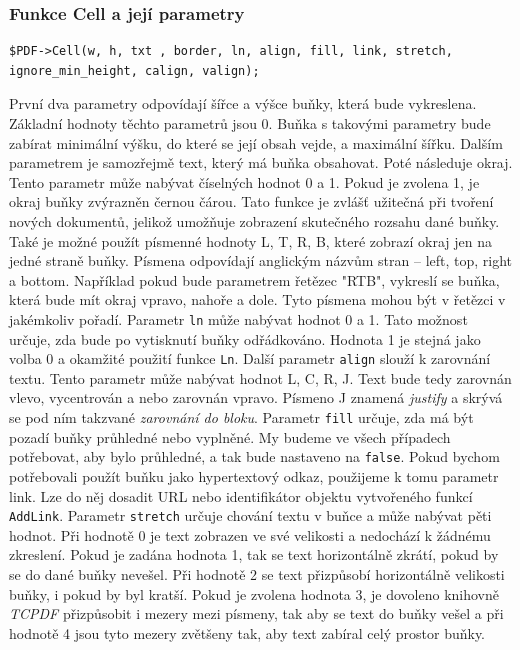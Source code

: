 \documentclass[czech,BP]{thesiskiv}
\begin{document}
\subsubsection{Funkce Cell a její parametry}
\begin{lstlisting}
$PDF->Cell(w, h, txt , border, ln, align, fill, link, stretch, ignore_min_height, calign, valign);
\end{lstlisting}
První dva parametry odpovídají šířce a výšce buňky, která bude vykreslena. Základní hodnoty těchto parametrů jsou 0. Buňka s takovými parametry bude zabírat minimální výšku, do které se její obsah vejde, a maximální šířku. 
Dalším parametrem je samozřejmě text, který má buňka obsahovat. 
Poté následuje okraj. Tento parametr může nabývat číselných hodnot 0 a 1. Pokud je zvolena 1, je okraj buňky zvýrazněn černou čárou. Tato funkce je zvlášť užitečná při tvoření nových dokumentů, jelikož umožňuje zobrazení skutečného rozsahu dané buňky. Také je možné použít písmenné hodnoty L, T, R, B, které zobrazí okraj jen na jedné straně buňky. Písmena odpovídají anglickým názvům stran -- left, top, right a bottom. Například pokud bude parametrem řetězec "RTB", vykreslí se buňka, která bude mít okraj vpravo, nahoře a dole. Tyto písmena mohou být v řetězci v jakémkoliv pořadí.
Parametr \texttt{ln} může nabývat hodnot 0 a 1. Tato možnost určuje, zda bude po vytisknutí buňky odřádkováno. Hodnota 1 je stejná jako volba 0 a okamžité použití funkce \texttt{Ln}. 
Další parametr \texttt{align} slouží k zarovnání textu. Tento parametr může nabývat hodnot L, C, R, J. Text bude tedy zarovnán vlevo, vycentrován a nebo zarovnán vpravo. Písmeno J znamená \emph{justify} a skrývá se pod ním takzvané \emph{zarovnání do bloku}. 
Parametr \texttt{fill} určuje, zda má být pozadí buňky průhledné nebo vyplněné. My budeme ve všech případech potřebovat, aby bylo průhledné, a tak bude nastaveno na \texttt{false}.
Pokud bychom potřebovali použít buňku jako hypertextový odkaz, použijeme k tomu parametr link. Lze do něj dosadit URL nebo identifikátor objektu vytvořeného funkcí \texttt{AddLink}.
Parametr \texttt{stretch} určuje chování textu v buňce a může nabývat pěti hodnot. Při hodnotě 0 je text zobrazen ve své velikosti a nedochází k žádnému zkreslení. Pokud je zadána hodnota 1, tak se text horizontálně zkrátí, pokud by se do dané buňky nevešel. Při hodnotě 2 se text přizpůsobí horizontálně velikosti buňky, i pokud by byl kratší. Pokud je zvolena hodnota 3, je dovoleno knihovně \emph{TCPDF} přizpůsobit i mezery mezi písmeny, tak aby se text do buňky vešel a při hodnotě 4 jsou tyto mezery zvětšeny tak, aby text zabíral celý prostor buňky. 
\end{document}
